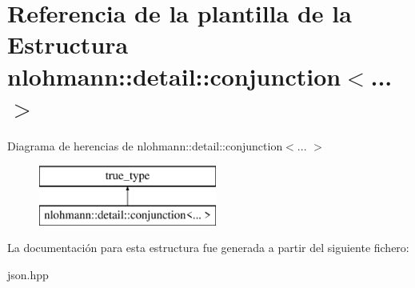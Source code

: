 \hypertarget{structnlohmann_1_1detail_1_1conjunction}{}\section{Referencia de la plantilla de la Estructura nlohmann\+:\+:detail\+:\+:conjunction$<$... $>$}
\label{structnlohmann_1_1detail_1_1conjunction}
Diagrama de herencias de nlohmann\+:\+:detail\+:\+:conjunction$<$... $>$\begin{figure}[H]
\begin{center}
\leavevmode
\includegraphics[height=2.000000cm]{structnlohmann_1_1detail_1_1conjunction}
\end{center}
\end{figure}


La documentación para esta estructura fue generada a partir del siguiente fichero\+:\begin{DoxyCompactItemize}
\item 
json.\+hpp\end{DoxyCompactItemize}
